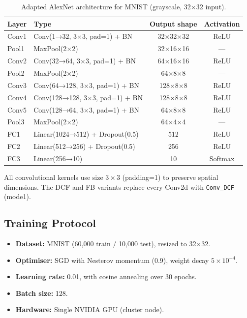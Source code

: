 \documentclass[11pt,letterpaper]{article}
\begin{document}
\begin{table}[h]
\centering
\caption{Adapted AlexNet architecture for MNIST (grayscale, 32×32 input).}
\label{tab:arch}
\begin{tabular}{llcc}
\toprule
Layer & Type & Output shape & Activation \\
\midrule
Conv1 & Conv(1→32, 3×3, pad=1) + BN & 32×32×32 & ReLU \\
Pool1 & MaxPool(2×2)                 & 32×16×16 & — \\
Conv2 & Conv(32→64, 3×3, pad=1) + BN & 64×16×16 & ReLU \\
Pool2 & MaxPool(2×2)                  & 64×8×8   & — \\
Conv3 & Conv(64→128, 3×3, pad=1) + BN & 128×8×8 & ReLU \\
Conv4 & Conv(128→128, 3×3, pad=1) + BN & 128×8×8 & ReLU \\
Conv5 & Conv(128→64, 3×3, pad=1) + BN  & 64×8×8  & ReLU \\
Pool3 & MaxPool(2×2)                    & 64×4×4  & — \\
FC1   & Linear(1024→512) + Dropout(0.5) & 512    & ReLU \\
FC2   & Linear(512→256) + Dropout(0.5)  & 256    & ReLU \\
FC3   & Linear(256→10)                  & 10     & Softmax \\
\bottomrule
\end{tabular}
\end{table}

All convolutional kernels use size $3{\times}3$ (padding=1) to preserve
spatial dimensions.  The DCF and FB variants replace every Conv2d with
\texttt{Conv\_DCF} (mode1).

\subsection{Training Protocol}

\begin{itemize}
  \item \textbf{Dataset:} MNIST (60{,}000 train / 10{,}000 test), resized to 32×32.
  \item \textbf{Optimiser:} SGD with Nesterov momentum (0.9), weight decay $5 \times 10^{-4}$.
  \item \textbf{Learning rate:} 0.01, with cosine annealing over 30 epochs.
  \item \textbf{Batch size:} 128.
  \item \textbf{Hardware:} Single NVIDIA GPU (cluster node).
\end{itemize}
\end{document}
